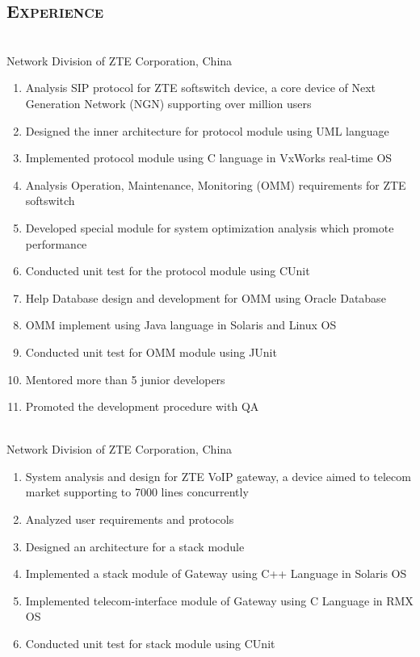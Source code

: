 \documentclass[margin,11pt]{res}
\begin{document}
\begin{resume}
\section{\textsc{Experience}} 
 \\
Network Division of ZTE Corporation, China

    \begin{enumerate}\itemsep -2pt %
    \item Analysis SIP protocol for ZTE softswitch device, a core device of Next Generation Network
      (NGN) supporting over million users
    \item Designed the inner architecture for protocol module using UML language
    \item Implemented protocol module using C language in VxWorks real-time OS
    \item Analysis Operation, Maintenance, Monitoring (OMM) requirements for ZTE softswitch
    \item Developed special module for system optimization analysis which promote performance
    \item Conducted unit test for the protocol module using CUnit
    \item Help Database design and development for OMM using Oracle Database
    \item OMM implement using Java language in Solaris and Linux OS
    \item Conducted unit test for OMM module using JUnit
    \item Mentored more than 5 junior developers
    \item Promoted the development procedure with QA
    \end{enumerate}
 
     \\
    Network Division of ZTE Corporation, China
     \begin{enumerate}\itemsep -2pt %
     \item System analysis and design for ZTE VoIP gateway, a device aimed to telecom market
       supporting to 7000 lines concurrently
     \item Analyzed user requirements and protocols
     \item Designed an architecture for a stack module
     \item Implemented a stack module of Gateway using C++ Language in Solaris OS
     \item Implemented telecom-interface module of Gateway using C Language in RMX OS
     \item Conducted unit test for stack module using CUnit
     \end{enumerate} 


\end{resume}
\end{document}
